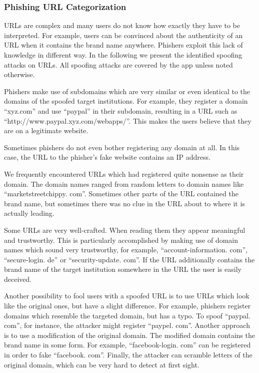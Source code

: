 \subsubsection{Phishing URL Categorization}
\label{s:url_categories}
URLs are complex and many users do not know how exactly they have to be interpreted.
 For example, users can be convinced about the authenticity of an URL when it contains the brand name anywhere.
 Phishers exploit this lack of knowledge in different way.
 In the following we present the identified spoofing attacks on URLs. 
 All spoofing attacks are covered by the app unless noted otherwise.

\begin{description}[leftmargin=0cm]
	\item[Subdomain] Phishers make use of subdomains which are very similar or even identical to the domains of the spoofed target institutions.
 For example, they register a domain  ``xyz.com'' and use ``paypal'' in their subdomain, resulting in a URL such as ``http://www.paypal.xyz.com/webapps/''.
 This makes the users believe that they are on a legitimate website.

	\item[IP Address] Sometimes phishers do not even bother registering any domain at all.
 In this case, the URL to the phisher's fake website contains an IP address.

	\item[Nonsense Domain] We frequently encountered URLs which had registered quite nonsense as their domain.
 The domain names ranged from random letters to domain names like ``marketstreetchippy.
com''. Sometimes other parts of the URL contained the brand name, but sometimes there was no clue in the URL about to where it is actually leading.

	\item[Trustworthy, But Unrelated Domain] Some URLs are very well-crafted.
 When reading them they appear meaningful and trustworthy.
 This is particularly accomplished by making use of domain names which sound very trustworthy, for example, ``account-information.
com'', ``secure-login.
de'' or ``security-update.
com''. If the URL additionally contains the brand name of the target institution somewhere in the URL the user is easily deceived.

	\item[Similar and Deceptive Domains] Another possibility to fool users with a spoofed URL is to use URLs which look like the original ones, but have a slight difference.
 For example, phishers register domains which resemble the targeted domain, but has a typo.
 To spoof ``paypal.
com'', for instance, the attacker might register ``paypel.
com''. Another approach is to use a modification of the original domain.
 The modified domain contains the brand name in some form.
 For example, ``facebook-login.
com'' can be registered in order to fake ``facebook.
com''. Finally, the attacker can scramble letters of the original domain, which can be very hard to detect at first sight.


\end{description}

